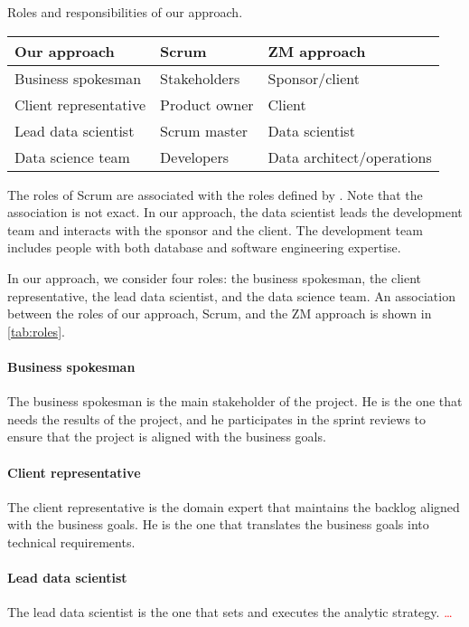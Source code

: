\begin{tablebox}[label=tab:roles]{Roles and responsibilities of our approach.}
  \centering
  \begin{tabular}{llp{2.5cm}}
    \toprule
    \textbf{Our approach} & \textbf{Scrum} & \textbf{ZM approach} \\
    \midrule
    Business spokesman & Stakeholders & Sponsor/client \\
    Client representative & Product owner & Client \\
    Lead data scientist & Scrum master & Data scientist \\
    Data science team & Developers & Data architect/operations \\
    \bottomrule
  \end{tabular}
  \tcblower
  The roles of Scrum are associated with the roles defined by \textcite{Zumel2019}.
  Note that the association is not exact.
  In our approach, the data scientist leads the development team and interacts with the sponsor
  and the client.  The development team includes people with both database and software
  engineering expertise.
\end{tablebox}

In our approach, we consider four roles: the business spokesman, the client representative,
the lead data scientist, and the data science team.  An association between the roles of
our approach, Scrum, and the ZM approach is shown in \cref{tab:roles}.

\paragraph{Business spokesman}  The business spokesman is the main stakeholder of the project.
He is the one that needs the results of the project, and he participates in the sprint
reviews to ensure that the project is aligned with the business goals.

\paragraph{Client representative}  The client representative is the domain expert that
maintains the backlog aligned with the business goals.  He is the one that translates the
business goals into technical requirements.

\paragraph{Lead data scientist}  The lead data scientist is the one that sets and executes
the analytic strategy.  \textcolor{red}{\dots}

